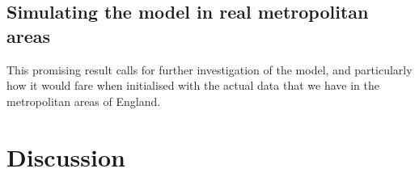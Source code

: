\documentclass[../thesis.tex]{subfiles}
\begin{document}
\subsection{Simulating the model in real metropolitan areas}
This promising result calls for further investigation of the model, and particularly how
it would fare when initialised with the actual data that we have in the metropolitan
areas of England.


\section{Discussion}
\end{document}
